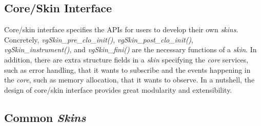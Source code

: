 \subsection{Core/Skin Interface}
Core/skin interface specifies the APIs for users to develop their own \textit{skins}. Concretely, \textit{vgSkin\_pre\_clo\_init()}, \textit{vgSkin\_post\_clo\_init()}, \textit{vgSkin\_instrument()}, and \textit{vgSkin\_fini()} are the necessary functions of a \textit{skin}. In addition, there are extra structure fields in a \textit{skin} specifying the \textit{core} services, such as error handling, that it wants to subscribe and the events happening in the \textit{core}, such as memory allocation, that it wants to observe. In a nutshell, the design of core/skin interface provides great modularity and extensibility.

\subsection{Common \textit{Skins}}
\label{sec:callgrind}

